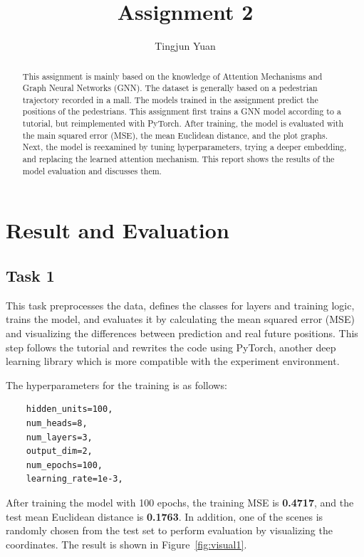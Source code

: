 \documentclass[conference]{IEEEtran}
\begin{document}
\title{Assignment 2}

\author{Tingjun Yuan}

\maketitle

\begin{abstract}
This assignment is mainly based on the knowledge of Attention Mechanisms and
Graph Neural Networks (GNN). The dataset is generally based on a pedestrian
trajectory recorded in a mall. The models trained in the assignment predict
the positions of the pedestrians. This assignment first trains a GNN model
according to a tutorial, but reimplemented with PyTorch. After training, the
model is evaluated with the main squared error (MSE), the mean Euclidean
distance, and the plot graphs. Next, the model is reexamined by tuning
hyperparameters, trying a deeper embedding, and replacing the learned attention
mechanism. This report shows the results of the model evaluation and discusses
them.
\end{abstract}

\section{Result and Evaluation}

\subsection*{Task 1}

This task preprocesses the data, defines the classes for layers and training
logic, trains the model, and evaluates it by calculating the mean squared error
(MSE) and visualizing the differences between prediction and real future
positions. This step follows the tutorial \cite{cite:tut} and rewrites the code
using PyTorch, another deep learning library which is more compatible with the
experiment environment.

The hyperparameters for the training is as follows:

\begin{verbatim}
    hidden_units=100,
    num_heads=8,
    num_layers=3,
    output_dim=2,
    num_epochs=100,
    learning_rate=1e-3,
\end{verbatim}

After training the model with 100 epochs, the training MSE is \textbf{0.4717},
and the test mean Euclidean distance is \textbf{0.1763}. In addition, one of
the scenes is randomly chosen from the test set to perform evaluation by
visualizing the coordinates. The result is shown in Figure~\ref{fig:visual1}.
\end{document}
